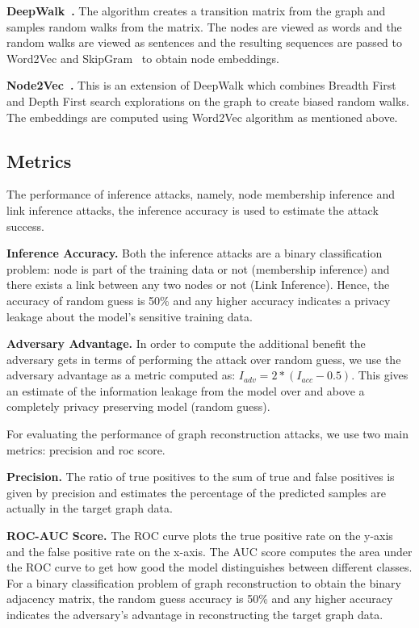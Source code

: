 \noindent\textbf{DeepWalk~\cite{deepwalk}.} The algorithm creates a transition matrix from the graph and samples random walks from the matrix.
The nodes are viewed as words and the random walks are viewed as sentences and the resulting sequences are passed to Word2Vec and SkipGram~\cite{wordemb} to obtain node embeddings.

\noindent\textbf{Node2Vec~\cite{node2vec}.} This is an extension of DeepWalk which combines Breadth First and Depth First search explorations on the graph to create biased random walks.
The embeddings are computed using Word2Vec algorithm as mentioned above.




\subsection{Metrics}

\noindent The performance of inference attacks, namely, node membership inference and link inference attacks, the inference accuracy is used to estimate the attack success.

\noindent\textbf{Inference Accuracy.} Both the inference attacks are a binary classification problem: node is part of the training data or not (membership inference) and there exists a link between any two nodes or not (Link Inference).
Hence, the accuracy of random guess is 50\% and any higher accuracy indicates a privacy leakage about the model's sensitive training data.

\noindent\textbf{Adversary Advantage.} In order to compute the additional benefit the adversary gets in terms of performing the attack over random guess, we use the adversary advantage as a metric computed as: $I_{adv} = 2*(I_{acc}-0.5)$.
This gives an estimate of the information leakage from the model over and above a completely privacy preserving model (random guess).

\noindent For evaluating the performance of graph reconstruction attacks, we use two main metrics: precision and roc score.

\noindent\textbf{Precision.} The ratio of true positives to the sum of true and false positives is given by precision and estimates the percentage of the predicted samples are actually in the target graph data.

\noindent\textbf{ROC-AUC Score.} The ROC curve plots the true positive rate on the y-axis and the false positive rate on the x-axis. The AUC score computes the area under the ROC curve to get how good the model distinguishes between different classes.
For a binary classification problem of graph reconstruction to obtain the binary adjacency matrix, the random guess accuracy is 50\% and any higher accuracy indicates the adversary's advantage in reconstructing the target graph data.

